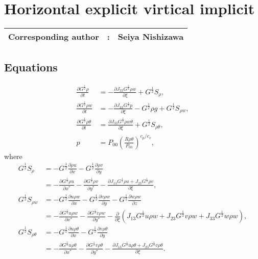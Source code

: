 \chapter{Horizontal explicit virtical implicit}
\label{chap:hevi}
{\bf \Large 
\begin{tabular}{ccc}
\hline
  Corresponding author & : & Seiya Nishizawa\\
\hline
\end{tabular}
}

\section{Equations}

\begin{align}
  \frac{\partial G^{\frac{1}{2}}\rho}{\partial t}
  &= -\frac{\partial J_{33}G^{\frac{1}{2}}\rho w}{\partial \xi} + G^{\frac{1}{2}}S_\rho, \\
  \frac{\partial G^{\frac{1}{2}}\rho w}{\partial t}
  &= -\frac{\partial J_{33}G^{\frac{1}{2}}p}{\partial \xi} -G^{\frac{1}{2}}\rho g + G^{\frac{1}{2}}S_{\rho w}, \\
  \frac{\partial G^{\frac{1}{2}}\rho\theta}{\partial t}
  &= \frac{\partial J_{33}G^{\frac{1}{2}}\rho w\theta}{\partial \xi} + G^{\frac{1}{2}}S_{\rho\theta}, \\
  p &= P_{00}\left(\frac{R\rho\theta}{P_{00}}\right)^{c_p/c_v},
\end{align}
where
\begin{align}
  G^{\frac{1}{2}}S_\rho
  &= - G^{\frac{1}{2}}\frac{\partial \rho u}{\partial x}
     - G^{\frac{1}{2}}\frac{\partial \rho v}{\partial y} \nonumber\\
  &= - \frac{\partial G^{\frac{1}{2}}\rho u}{\partial x^*}
     - \frac{\partial G^{\frac{1}{2}}\rho v}{\partial y^*}
     - \frac{\partial J_{13}G^{\frac{1}{2}}\rho u + J_{23}G^{\frac{1}{2}}\rho v}{\partial \xi}, \\
  G^{\frac{1}{2}}S_{\rho w}
  &= - G^{\frac{1}{2}}\frac{\partial u\rho w}{\partial x}
     - G^{\frac{1}{2}}\frac{\partial v\rho w}{\partial y}
     - G^{\frac{1}{2}}\frac{\partial w\rho w}{\partial z} \nonumber\\
  &= - \frac{\partial G^{\frac{1}{2}}u\rho w}{\partial x^*}
     - \frac{\partial G^{\frac{1}{2}}v\rho w}{\partial y^*}
     - \frac{\partial}{\partial \xi}(J_{13}G^{\frac{1}{2}}u\rho w + J_{23}G^{\frac{1}{2}}v\rho w + J_{33}G^{\frac{1}{2}}w\rho w), \\
  G^{\frac{1}{2}}S_{\rho\theta}
  &= - G^{\frac{1}{2}}\frac{\partial u\rho\theta}{\partial x}
     - G^{\frac{1}{2}}\frac{\partial v\rho\theta}{\partial y} \nonumber\\
  &= - \frac{\partial G^{\frac{1}{2}}u\rho\theta}{\partial x^*}
     - \frac{\partial G^{\frac{1}{2}}v\rho\theta}{\partial y^*}
     - \frac{\partial J_{13}G^{\frac{1}{2}}u\rho\theta+J_{23}G^{\frac{1}{2}}v\rho\theta}{\partial \xi}.
\end{align}

